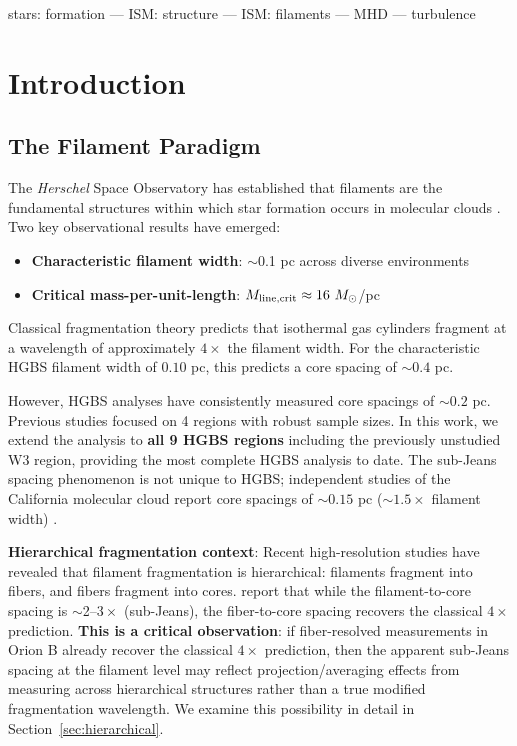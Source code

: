 \documentclass[11pt,a4paper]{article}
\begin{document}
stars: formation --- ISM: structure --- ISM: filaments --- MHD --- turbulence

\section{Introduction}

\subsection{The Filament Paradigm}

The \textit{Herschel} Space Observatory has established that filaments are the fundamental structures within which star formation occurs in molecular clouds \citep{Andre2010}. Two key observational results have emerged:

\begin{itemize}
    \item \textbf{Characteristic filament width}: $\sim$0.1 pc across diverse environments \citep{Arzoumanian2011}
    \item \textbf{Critical mass-per-unit-length}: $M_{\rm line,crit} \approx 16~M_\odot$/pc \citep{Ostriker1964}
\end{itemize}

Classical fragmentation theory \citep{Inutsuka1992} predicts that isothermal gas cylinders fragment at a wavelength of approximately $4\times$ the filament width. For the characteristic HGBS filament width of $0.10$ pc, this predicts a core spacing of $\sim0.4$ pc.

However, HGBS analyses have consistently measured core spacings of $\sim0.2$ pc. Previous studies focused on 4 regions with robust sample sizes. In this work, we extend the analysis to \textbf{all 9 HGBS regions} including the previously unstudied W3 region, providing the most complete HGBS analysis to date. The sub-Jeans spacing phenomenon is not unique to HGBS; independent studies of the California molecular cloud report core spacings of $\sim0.15$ pc ($\sim1.5\times$ filament width) \citep{Zhang2024}.

\textbf{Hierarchical fragmentation context}: Recent high-resolution studies \citep{Yang2024} have revealed that filament fragmentation is hierarchical: filaments fragment into fibers, and fibers fragment into cores. \citet{Yang2024} report that while the filament-to-core spacing is $\sim$2--$3\times$ (sub-Jeans), the fiber-to-core spacing recovers the classical $4\times$ prediction. \textbf{This is a critical observation}: if fiber-resolved measurements in Orion B already recover the classical $4\times$ prediction, then the apparent sub-Jeans spacing at the filament level may reflect projection/averaging effects from measuring across hierarchical structures rather than a true modified fragmentation wavelength. We examine this possibility in detail in Section~\ref{sec:hierarchical}.
\end{document}
